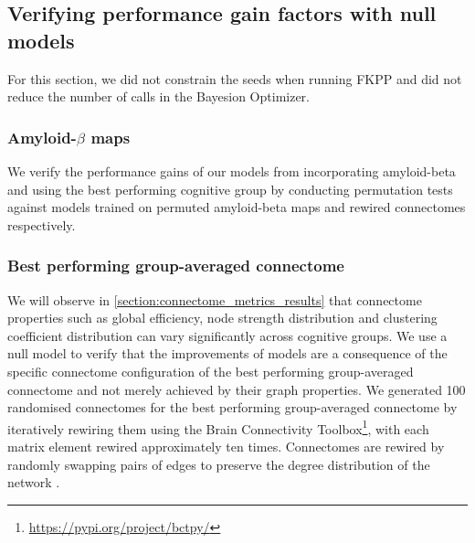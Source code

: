 \subsection{Verifying performance gain factors with null models}
For this section, we did not constrain the seeds when running FKPP and did not reduce the number of calls in the Bayesion Optimizer.

\subsubsection{Amyloid-$\beta$ maps}
We verify the performance gains of our models from incorporating amyloid-beta and using the best performing cognitive group by conducting permutation tests against models trained on permuted amyloid-beta maps and rewired connectomes respectively.

\subsubsection{Best performing group-averaged connectome}
We will observe in \autoref{section:connectome_metrics_results} that connectome properties such as global efficiency, node strength distribution and clustering coefficient distribution can vary significantly across cognitive groups. We use a null model to verify that the improvements of models are a consequence of the specific connectome configuration of the best performing group-averaged connectome and not merely achieved by their graph properties. We generated 100 randomised connectomes for the best performing group-averaged connectome by iteratively rewiring them using the Brain Connectivity Toolbox\footnote{\url{https://pypi.org/project/bctpy/}}, with each matrix element rewired approximately ten times. Connectomes are rewired by randomly swapping pairs of edges to preserve the degree distribution of the network \citep{vasaNullModelsNetwork2022}.



